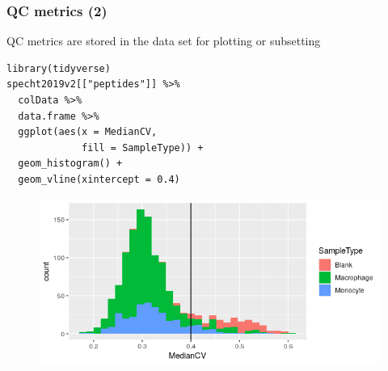 \documentclass{beamer}
\newcommand{\frametitlesection}[1]{\frametitle{\centering #1 \footnotesize \hspace{0pt plus 1 filll} \insertsection}}
\begin{document}
\begin{frame}[fragile]
    \frametitlesection{QC metrics (2)}

    QC metrics are stored in the data set for plotting or subsetting
    
    \begin{lstlisting}[basicstyle = \scriptsize\ttfamily\color{vdgray}]
library(tidyverse)
specht2019v2[["peptides"]] %>%
  colData %>%
  data.frame %>%
  ggplot(aes(x = MedianCV, 
             fill = SampleType)) +
  geom_histogram() +
  geom_vline(xintercept = 0.4)
    \end{lstlisting}
    
    \begin{figure}
        \centering
        \includegraphics[width=.7\linewidth]{figs/medianCV.png}
    \end{figure}
\end{frame}
\end{document}

